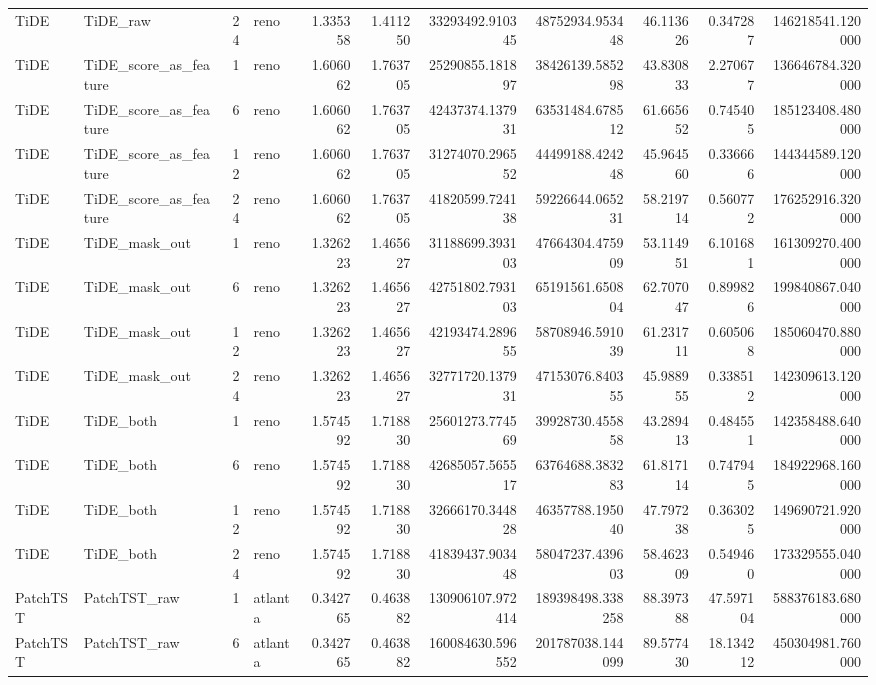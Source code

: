 \begin{longtable}{llrlrrrrrrr}
TiDE & TiDE\_raw & 24 & reno & 1.335358 & 1.411250 & 33293492.910345 & 48752934.953448 & 46.113626 & 0.347287 & 146218541.120000 \\
TiDE & TiDE\_score\_as\_feature & 1 & reno & 1.606062 & 1.763705 & 25290855.181897 & 38426139.585298 & 43.830833 & 2.270677 & 136646784.320000 \\
TiDE & TiDE\_score\_as\_feature & 6 & reno & 1.606062 & 1.763705 & 42437374.137931 & 63531484.678512 & 61.665652 & 0.745405 & 185123408.480000 \\
TiDE & TiDE\_score\_as\_feature & 12 & reno & 1.606062 & 1.763705 & 31274070.296552 & 44499188.424248 & 45.964560 & 0.336666 & 144344589.120000 \\
TiDE & TiDE\_score\_as\_feature & 24 & reno & 1.606062 & 1.763705 & 41820599.724138 & 59226644.065231 & 58.219714 & 0.560772 & 176252916.320000 \\
TiDE & TiDE\_mask\_out & 1 & reno & 1.326223 & 1.465627 & 31188699.393103 & 47664304.475909 & 53.114951 & 6.101681 & 161309270.400000 \\
TiDE & TiDE\_mask\_out & 6 & reno & 1.326223 & 1.465627 & 42751802.793103 & 65191561.650804 & 62.707047 & 0.899826 & 199840867.040000 \\
TiDE & TiDE\_mask\_out & 12 & reno & 1.326223 & 1.465627 & 42193474.289655 & 58708946.591039 & 61.231711 & 0.605068 & 185060470.880000 \\
TiDE & TiDE\_mask\_out & 24 & reno & 1.326223 & 1.465627 & 32771720.137931 & 47153076.840355 & 45.988955 & 0.338512 & 142309613.120000 \\
TiDE & TiDE\_both & 1 & reno & 1.574592 & 1.718830 & 25601273.774569 & 39928730.455858 & 43.289413 & 0.484551 & 142358488.640000 \\
TiDE & TiDE\_both & 6 & reno & 1.574592 & 1.718830 & 42685057.565517 & 63764688.383283 & 61.817114 & 0.747945 & 184922968.160000 \\
TiDE & TiDE\_both & 12 & reno & 1.574592 & 1.718830 & 32666170.344828 & 46357788.195040 & 47.797238 & 0.363025 & 149690721.920000 \\
TiDE & TiDE\_both & 24 & reno & 1.574592 & 1.718830 & 41839437.903448 & 58047237.439603 & 58.462309 & 0.549460 & 173329555.040000 \\
PatchTST & PatchTST\_raw & 1 & atlanta & 0.342765 & 0.463882 & 130906107.972414 & 189398498.338258 & 88.397388 & 47.597104 & 588376183.680000 \\
PatchTST & PatchTST\_raw & 6 & atlanta & 0.342765 & 0.463882 & 160084630.596552 & 201787038.144099 & 89.577430 & 18.134212 & 450304981.760000 \\

\end{longtable}

